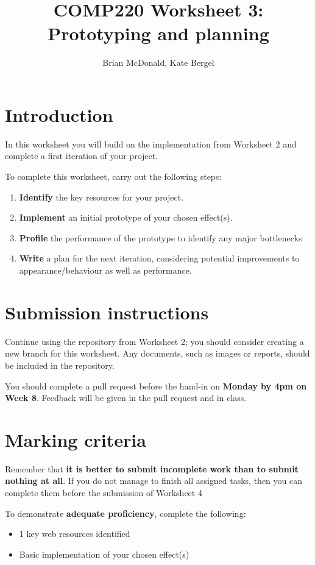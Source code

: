 \documentclass{../../../fal_assignment}
\title{COMP220 Worksheet 3: Prototyping and planning}
\author{Brian McDonald, Kate Bergel}
\begin{document}
\maketitle

\section*{Introduction}

In this worksheet you will build on the implementation from Worksheet 2 and complete a first iteration of your project.

To complete this worksheet, carry out the following steps:
\begin{enumerate}[label=(\alph*)]
	\item \textbf{Identify} the key resources for your project.
	\item \textbf{Implement} an initial prototype of your chosen effect(s).
	\item \textbf{Profile} the performance of the prototype to identify any major bottlenecks
	\item \textbf{Write} a plan for the next iteration, considering potential improvements to appearance/behaviour as well as performance.
\end{enumerate}

\section*{Submission instructions}

Continue using the repository from Worksheet 2; you should consider creating a new branch for this worksheet. Any documents, such as images or reports, should be included in the repository.

You should complete a pull request before the hand-in on \textbf{Monday by 4pm on Week 8}. Feedback will be given in the pull request and in class.

\section*{Marking criteria}

Remember that \textbf{it is better to submit incomplete work than to submit nothing at all}. If you do not manage to finish all assigned tasks, then you can complete them before the submission of Worksheet 4

To demonstrate \textbf{adequate proficiency}, complete the following:
\begin{itemize}
	\item 1 key web resources identified
	\item Basic implementation of your chosen effect(s)
\end{itemize} 
\end{document}
